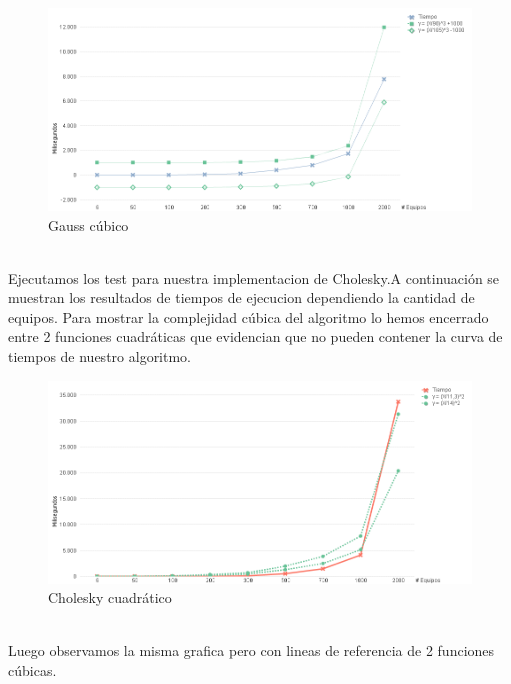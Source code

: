 \begin{figure}[H]
\centering
\includegraphics[width=1\textwidth]{IMG/gauss cubico.png}
\caption{Gauss cúbico}
\label{fig:Gauss cúbico}
\end{figure}

\\
Ejecutamos los test para nuestra implementacion de Cholesky.A continuación se muestran los resultados de tiempos de ejecucion dependiendo la cantidad de equipos. Para mostrar la complejidad cúbica del algoritmo lo hemos encerrado entre 2 funciones cuadráticas que evidencian que no pueden contener la curva de tiempos de nuestro algoritmo.\\


\begin{figure}[H]
\centering
\includegraphics[width=1\textwidth]{IMG/cholesky cuadratico.png}
\caption{Cholesky cuadrático}
\label{fig:Cholesky cuadrático}
\end{figure}

\\

Luego observamos la misma grafica pero con lineas de referencia de 2 funciones cúbicas.\\

